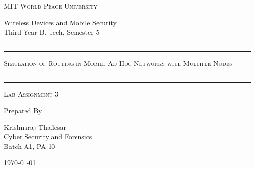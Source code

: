 \documentclass[11pt]{article}
\begin{document}
\begin{titlepage}
    \centering


    \huge\textsc{
        MIT World Peace University
    }\\

    \vspace{0.75\baselineskip} %

    \LARGE{
        Wireless Devices and Mobile Security\\
        Third Year B. Tech, Semester 5
    }

    \vfill %


    \rule{\textwidth}{1.6pt}\vspace*{-\baselineskip}\vspace*{2pt}
    \rule{\textwidth}{0.6pt}
    \vspace{0.75\baselineskip} %



    \huge{\textsc{
            Simulation of Routing in Mobile Ad Hoc Networks with Multiple Nodes
        }} \\



    \vspace{0.5\baselineskip} %
    \rule{\textwidth}{0.6pt}\vspace*{-\baselineskip}\vspace*{2.8pt}
    \rule{\textwidth}{1.6pt}

    \vspace{1\baselineskip} %


    \LARGE\textsc{
        Lab Assignment 3
    } %
    \vfill


    Prepared By
    \vspace{0.5\baselineskip} %

    \Large{
        Krishnaraj Thadesar \\
        Cyber Security and Forensics\\
        Batch A1, PA 10
    }


    \vspace{0.5\baselineskip} %
    \today

\end{titlepage}
\end{document}
